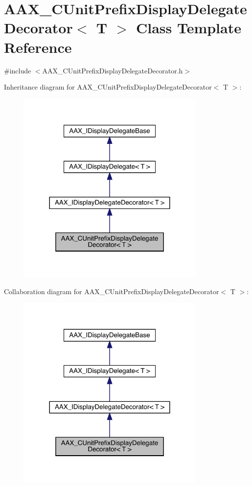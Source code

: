 \hypertarget{a01589}{}\section{A\+A\+X\+\_\+\+C\+Unit\+Prefix\+Display\+Delegate\+Decorator$<$ T $>$ Class Template Reference}
\label{a01589}


{\ttfamily \#include $<$A\+A\+X\+\_\+\+C\+Unit\+Prefix\+Display\+Delegate\+Decorator.\+h$>$}



Inheritance diagram for A\+A\+X\+\_\+\+C\+Unit\+Prefix\+Display\+Delegate\+Decorator$<$ T $>$\+:
\nopagebreak
\begin{figure}[H]
\begin{center}
\leavevmode
\includegraphics[width=264pt]{a01588}
\end{center}
\end{figure}


Collaboration diagram for A\+A\+X\+\_\+\+C\+Unit\+Prefix\+Display\+Delegate\+Decorator$<$ T $>$\+:
\nopagebreak
\begin{figure}[H]
\begin{center}
\leavevmode
\includegraphics[width=264pt]{a01587}
\end{center}
\end{figure}


